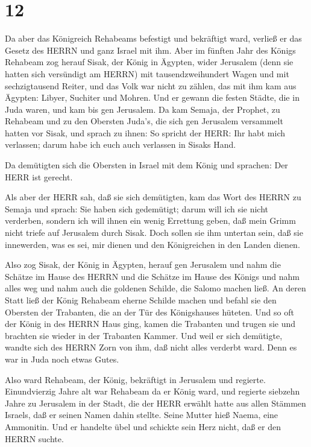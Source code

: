 \hypertarget{section-11}{%
\section{12}\label{section-11}}

 Da aber das Königreich Rehabeams befestigt und bekräftigt
ward, verließ er das Gesetz des HERRN und ganz Israel mit ihm.
 Aber im fünften Jahr des Königs Rehabeam zog herauf Sisak,
der König in Ägypten, wider Jerusalem (denn sie hatten sich versündigt
am HERRN)  mit tausendzweihundert Wagen und mit
sechzigtausend Reiter, und das Volk war nicht zu zählen, das mit ihm kam
aus Ägypten: Libyer, Suchiter und Mohren.  Und er gewann die
festen Städte, die in Juda waren, und kam bis gen Jerusalem.
 Da kam Semaja, der Prophet, zu Rehabeam und zu den Obersten
Juda's, die sich gen Jerusalem versammelt hatten vor Sisak, und sprach
zu ihnen: So spricht der HERR: Ihr habt mich verlassen; darum habe ich
euch auch verlassen in Sisaks Hand.

 Da demütigten sich die Obersten in Israel mit dem König und
sprachen: Der HERR ist gerecht.

 Als aber der HERR sah, daß sie sich demütigten, kam das
Wort des HERRN zu Semaja und sprach: Sie haben sich gedemütigt; darum
will ich sie nicht verderben, sondern ich will ihnen ein wenig Errettung
geben, daß mein Grimm nicht triefe auf Jerusalem durch Sisak.
 Doch sollen sie ihm untertan sein, daß sie innewerden, was
es sei, mir dienen und den Königreichen in den Landen dienen.

 Also zog Sisak, der König in Ägypten, herauf gen Jerusalem
und nahm die Schätze im Hause des HERRN und die Schätze im Hause des
Königs und nahm alles weg und nahm auch die goldenen Schilde, die Salomo
machen ließ.  An deren Statt ließ der König Rehabeam eherne
Schilde machen und befahl sie den Obersten der Trabanten, die an der Tür
des Königshauses hüteten.  Und so oft der König in des
HERRN Haus ging, kamen die Trabanten und trugen sie und brachten sie
wieder in der Trabanten Kammer.  Und weil er sich
demütigte, wandte sich des HERRN Zorn von ihm, daß nicht alles verderbt
ward. Denn es war in Juda noch etwas Gutes.

 Also ward Rehabeam, der König, bekräftigt in Jerusalem und
regierte. Einundvierzig Jahre alt war Rehabeam da er König ward, und
regierte siebzehn Jahre zu Jerusalem in der Stadt, die der HERR erwählt
hatte aus allen Stämmen Israels, daß er seinen Namen dahin stellte.
Seine Mutter hieß Naema, eine Ammonitin.  Und er handelte
übel und schickte sein Herz nicht, daß er den HERRN suchte.

